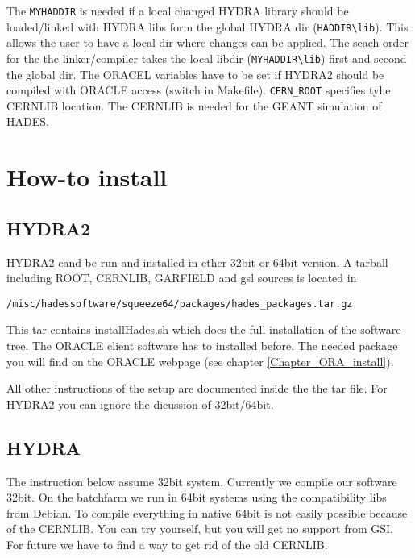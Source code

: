 The \verb+MYHADDIR+ is needed if a local changed HYDRA library should be 
loaded/linked with HYDRA libs form the global HYDRA dir (\verb+HADDIR\lib+). 
This allows the user to have a local dir where changes can be applied. The 
seach order for the the linker/compiler takes the local libdir (\verb+MYHADDIR\lib+)
first and second the global dir. The ORACEL variables have to be set if
HYDRA2 should be compiled with ORACLE access (switch in Makefile).
\verb+CERN_ROOT+ specifies tyhe CERNLIB location. The CERNLIB is needed
for the GEANT simulation of HADES.

\clearpage



\clearpage


\section{How-to install}

\subsection{HYDRA2}

HYDRA2 cand be run and installed in ether 32bit or 64bit
version. A tarball including ROOT, CERNLIB, GARFIELD and gsl
sources is located in

\begin{lstlisting}
/misc/hadessoftware/squeeze64/packages/hades_packages.tar.gz
\end{lstlisting}

This tar contains installHades.sh which does the full 
installation of the software tree. The ORACLE client software
has to installed before. The needed package you will find
on the ORACLE webpage (see chapter \ref{Chapter_ORA_install}).

All other instructions of the setup are documented inside the
the tar file. For HYDRA2 you can ignore the dicussion of
32bit/64bit.



\subsection{HYDRA}

The instruction below assume 32bit system. Currently
we compile our software 32bit. On the batchfarm we run in
64bit systems using the compatibility libs from Debian.
To compile everything in native 64bit is not easily possible
because of the CERNLIB. You can try yourself, but you will
get no support from GSI. For future we have to find a way
to get rid of the old CERNLIB.

